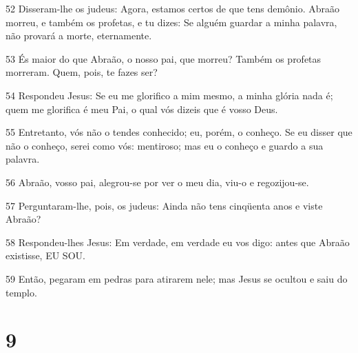 \par 52 Disseram-lhe os judeus: Agora, estamos certos de que tens demônio. Abraão morreu, e também os profetas, e tu dizes: Se alguém guardar a minha palavra, não provará a morte, eternamente.
\par 53 És maior do que Abraão, o nosso pai, que morreu? Também os profetas morreram. Quem, pois, te fazes ser?
\par 54 Respondeu Jesus: Se eu me glorifico a mim mesmo, a minha glória nada é; quem me glorifica é meu Pai, o qual vós dizeis que é vosso Deus.
\par 55 Entretanto, vós não o tendes conhecido; eu, porém, o conheço. Se eu disser que não o conheço, serei como vós: mentiroso; mas eu o conheço e guardo a sua palavra.
\par 56 Abraão, vosso pai, alegrou-se por ver o meu dia, viu-o e regozijou-se.
\par 57 Perguntaram-lhe, pois, os judeus: Ainda não tens cinqüenta anos e viste Abraão?
\par 58 Respondeu-lhes Jesus: Em verdade, em verdade eu vos digo: antes que Abraão existisse, EU SOU.
\par 59 Então, pegaram em pedras para atirarem nele; mas Jesus se ocultou e saiu do templo.

\chapter{9}

